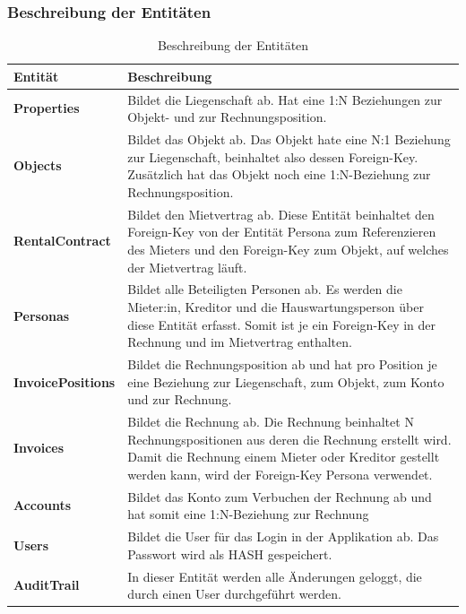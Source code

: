 \subsubsection{Beschreibung der Entitäten}
\begin{table}[H]
  \centering
  \settowidth{}
  \setlength\extrarowheight{2pt}
    \begin{tabulary}{1.0\textwidth}{|L|m{15cm}|}
      \hline
      \textbf{Entität}& \textbf{Beschreibung}\\
    \hline
    \textbf{Properties} & Bildet die Liegenschaft ab. Hat eine 1:N Beziehungen zur Objekt- und zur Rechnungsposition.\\
    \hline
    \textbf{Objects} & Bildet das Objekt ab. Das Objekt hate eine N:1 Beziehung zur Liegenschaft, beinhaltet also dessen Foreign-Key. Zusätzlich hat das Objekt noch eine 1:N-Beziehung zur Rechnungsposition.\\
    \hline
    \textbf{RentalContract} & Bildet den Mietvertrag ab. Diese Entität beinhaltet den Foreign-Key von der Entität Persona zum Referenzieren des Mieters und den Foreign-Key zum Objekt, auf welches der Mietvertrag läuft. \\
    \hline
    \textbf{Personas} & Bildet alle Beteiligten Personen ab. Es werden die Mieter:in, Kreditor und die Hauswartungsperson über diese Entität erfasst. Somit ist je ein Foreign-Key in der Rechnung und im Mietvertrag enthalten. \\
    \hline
    \textbf{InvoicePositions} & Bildet die Rechnungsposition ab und hat pro Position je eine Beziehung zur Liegenschaft, zum Objekt, zum Konto und zur Rechnung.\\
    \hline
    \textbf{Invoices} & Bildet die Rechnung ab. Die Rechnung beinhaltet N Rechnungspositionen aus deren die Rechnung erstellt wird. Damit die Rechnung einem Mieter oder Kreditor gestellt werden kann, wird der Foreign-Key Persona verwendet.\\
    \hline
    \textbf{Accounts} & Bildet das Konto zum Verbuchen der Rechnung ab und hat somit eine 1:N-Beziehung zur Rechnung\\
    \hline
    \textbf{Users} & Bildet die User für das Login in der Applikation ab. Das Passwort wird als HASH gespeichert.\\
    \hline 
    \textbf{AuditTrail} & In dieser Entität werden alle Änderungen geloggt, die durch einen User durchgeführt werden.\\
    \hline 
\end{tabulary}
\caption{Beschreibung der Entitäten}
\end{table}

